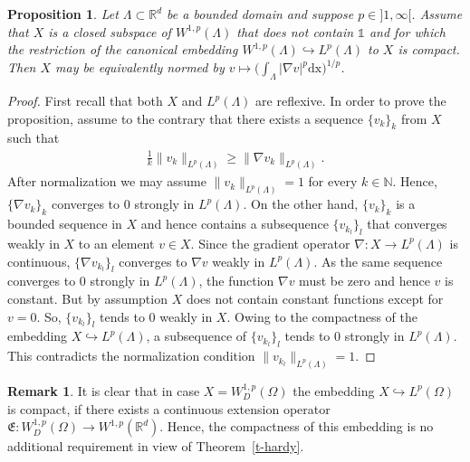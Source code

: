 \documentclass[10pt,leqno]{amsart}
\newtheorem{proposition}[theorem]{Proposition}
\theoremstyle{definition}
\newtheorem{remark}[theorem]{Remark}
\numberwithin{equation}{section}
\begin{document}
\begin{proposition} \label{t-constant}
 Let $\Lambda \subset {{\mathbb R}}^d$ be a bounded domain and suppose $p \in
 {]1,\infty[}$. Assume that $X$ is a closed subspace of $W^{1,p}(\Lambda)$ that
 does not contain $\mathds 1$ and for which the restriction of the canonical
 embedding $W^{1,p}(\Lambda) \hookrightarrow L^p(\Lambda)$ to $X$ is
 compact. Then $X$ may be equivalently normed by $v \mapsto \bigl( \int_\Lambda
 |\nabla v|^p \mathrm{d} {{\mathrm x}} \bigr)^{1/p}$.
\end{proposition} 

\begin{proof}
 First recall that both $X$ and $L^p(\Lambda)$ are reflexive. In order to
 prove the proposition, assume to the contrary that there exists a sequence
 $\{v_k\}_k$ from $X$ such that
 \begin{align*}
  \frac{1}{k} \|v_k\|_{L^p(\Lambda)} \ge \|\nabla v_k\|_{L^p(\Lambda)}.
 \end{align*}
 After normalization we may assume $\|v_k\|_{L^p(\Lambda)} = 1$ for every $k
 \in {{\mathbb N}}$. Hence, $\{\nabla v_k\}_k$ converges to $0$ strongly in $L^p(\Lambda)$.
 On the other hand, $\{v_k\}_k$ is a bounded sequence in $X$ and hence contains
 a subsequence $\{v_{k_l}\}_l$ that converges weakly in $X$ to an element $v \in
 X$. Since the gradient operator $\nabla : X \to L^p(\Lambda)$ is
 continuous, $\{\nabla v_{k_l}\}_l$ converges to $\nabla v$ weakly in 
 $L^p(\Lambda)$. As the same sequence converges to $0$ strongly in
 $L^p(\Lambda)$, the function $\nabla v$ must be zero and hence $v$ is constant.
 But by assumption $X$ does not contain constant functions except for $v = 0$.
 So, $\{v_{k_l}\}_l$  tends to $0$ weakly in $X$. Owing to the compactness of
 the embedding $X \hookrightarrow L^p(\Lambda)$, a subsequence of
 $\{v_{k_l}\}_l$ tends to $0$ strongly in $L^p(\Lambda)$. This contradicts
 the normalization condition $\|v_{k_l}\|_{L^p(\Lambda)} = 1$.
\end{proof}

\begin{remark} \label{r-bederfuellt}
 It is clear that in case $X = W^{1,p}_D(\Omega)$ the embedding $X
 \hookrightarrow L^p(\Omega)$ is compact, if there exists a continuous
 extension operator $\mathfrak E : W^{1,p}_D(\Omega) \to W^{1,p}({{\mathbb R}}^d)$. Hence,
 the compactness of this embedding is no additional requirement in view of
 Theorem~\ref{t-hardy}.
\end{remark}
\end{document}
